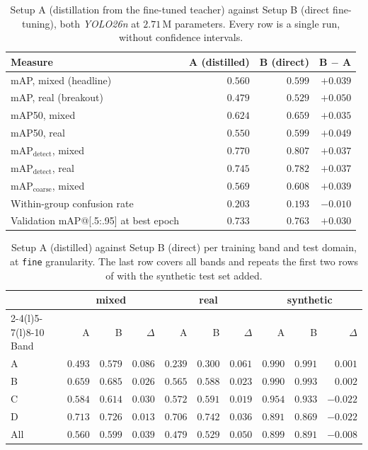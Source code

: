 \begin{table}[htbp]
\centering
\caption[Distillation against direct fine-tuning for the student]{Setup A (distillation from the fine-tuned teacher) against Setup B (direct fine-tuning), both \textit{YOLO26n} at $2.71\,\mathrm{M}$ parameters. Every row is a single run, without confidence intervals.}
\label{tab:kd-vs-direct}
\begin{tabular}{@{}lrrr@{}}
\toprule
Measure & A (distilled) & B (direct) & B $-$ A \\
\midrule
mAP, mixed (headline) & $0.560$ & $\mathbf{0.599}$ & $+0.039$ \\
mAP, real (breakout) & $0.479$ & $\mathbf{0.529}$ & $+0.050$ \\
mAP50, mixed & $0.624$ & $0.659$ & $+0.035$ \\
mAP50, real & $0.550$ & $0.599$ & $+0.049$ \\
$\mathrm{mAP}_{\text{detect}}$, mixed & $0.770$ & $0.807$ & $+0.037$ \\
$\mathrm{mAP}_{\text{detect}}$, real & $0.745$ & $0.782$ & $+0.037$ \\
$\mathrm{mAP}_{\text{coarse}}$, mixed & $0.569$ & $0.608$ & $+0.039$ \\
\midrule
Within-group confusion rate & $0.203$ & $0.193$ & $-0.010$ \\
Validation mAP@[.5:.95] at best epoch & $0.733$ & $0.763$ & $+0.030$ \\
\bottomrule
\end{tabular}
\end{table}

\begin{table}[htbp]
\centering
\caption[Distillation against direct fine-tuning per band and test domain]{Setup A (distilled) against Setup B (direct) per training band and test domain, at \texttt{fine} granularity. The last row covers all bands and repeats the first two rows of  with the synthetic test set added.}
\label{tab:kd-vs-direct-bands}
\small
\begin{tabular}{@{}lrrrrrrrrr@{}}
\toprule
 & \multicolumn{3}{c}{mixed} & \multicolumn{3}{c}{real} & \multicolumn{3}{c}{synthetic} \\
\cmidrule(l){2-4}\cmidrule(l){5-7}\cmidrule(l){8-10}
Band & A & B & $\Delta$ & A & B & $\Delta$ & A & B & $\Delta$ \\
\midrule
A & $0.493$ & $0.579$ & $0.086$ & $0.239$ & $0.300$ & $0.061$ & $0.990$ & $0.991$ & $0.001$ \\
B & $0.659$ & $0.685$ & $0.026$ & $0.565$ & $0.588$ & $0.023$ & $0.990$ & $0.993$ & $0.002$ \\
C & $0.584$ & $0.614$ & $0.030$ & $0.572$ & $0.591$ & $0.019$ & $0.954$ & $0.933$ & $-0.022$ \\
D & $0.713$ & $0.726$ & $0.013$ & $0.706$ & $0.742$ & $0.036$ & $0.891$ & $0.869$ & $-0.022$ \\
\midrule
All & $0.560$ & $0.599$ & $0.039$ & $0.479$ & $0.529$ & $0.050$ & $0.899$ & $0.891$ & $-0.008$ \\
\bottomrule
\end{tabular}
\end{table}

